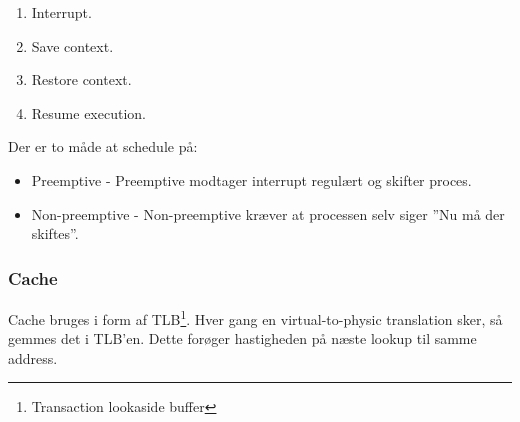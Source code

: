 \begin{enumerate}
	\item Interrupt.
	\item Save context.
	\item Restore context.
	\item Resume execution.
\end{enumerate}

Der er to måde at schedule på:

\begin{itemize}
	\item Preemptive - Preemptive modtager interrupt regulært og skifter proces.
	\item Non-preemptive - Non-preemptive kræver at processen selv siger ''Nu må der skiftes''.
\end{itemize}

\subsubsection{Cache}
Cache bruges i form af TLB\footnote{Transaction lookaside buffer}.
Hver gang en virtual-to-physic translation sker, så gemmes det i TLB’en. Dette forøger hastigheden på næste lookup til samme address. 